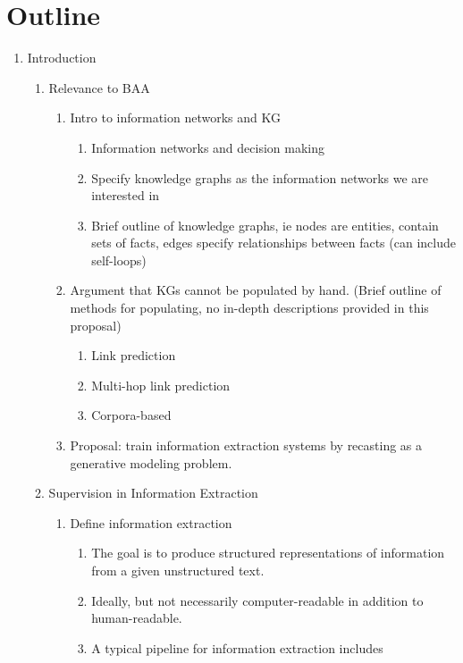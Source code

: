 \documentclass[12pt]{article}
\begin{document}
\section*{Outline}
\begin{enumerate}
\item Introduction
    \begin{enumerate}
    \item Relevance to BAA
        \begin{enumerate}
        \item Intro to information networks and KG
            \begin{enumerate}
            \item Information networks and decision making
            \item Specify knowledge graphs as the information networks we are interested in
            \item Brief outline of knowledge graphs, ie nodes are entities, contain sets of facts,
                edges specify relationships between facts (can include self-loops)
            \end{enumerate}
        \item Argument that KGs cannot be populated by hand. (Brief outline of methods for populating,
            no in-depth descriptions provided in this proposal)
            \begin{enumerate}
            \item Link prediction
            \item Multi-hop link prediction
            \item Corpora-based
            \end{enumerate}
        \item Proposal: train information extraction systems by recasting as a
            generative modeling problem.
        \end{enumerate}
    \item Supervision in Information Extraction
        \begin{enumerate}
        \item Define information extraction
            \begin{enumerate}
            \item The goal is to produce structured representations of information from
                a given unstructured text.
            \item Ideally, but not necessarily computer-readable in addition to human-readable.
            \item A typical pipeline for information extraction includes

\end{enumerate}
\end{enumerate}
\end{enumerate}
\end{enumerate}
\end{document}
